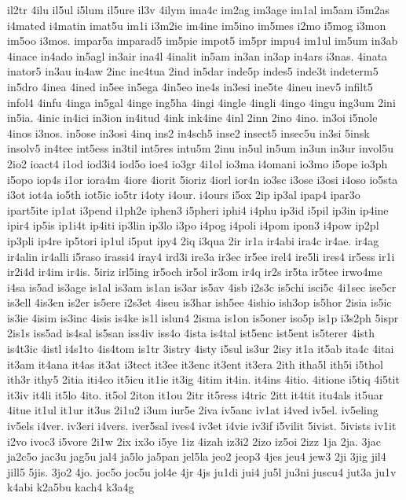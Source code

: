 {il2tr
4ilu
il5ul
i5lum
il5ure
il3v
4ilym
ima4c
im2ag
im3age
im1al
im5am
i5m2as
i4mated
i4matin
imat5u
im1i
i3m2ie
im4ine
im5ino
im5mes
i2mo
i5mog
i3mon
im5oo
i3mos.
impar5a
imparad5
im5pie
impot5
im5pr
impu4
im1ul
im5um
in3ab
4inace
in4ado
in5agl
in3air
ina4l
4inalit
in5am
in3an
in3ap
in4ars
i3nas.
4inata
inator5
in3au
in4aw
2inc
inc4tua
2ind
in5dar
inde5p
indes5
inde3t
indeterm5
in5dro
4inea
4ined
in5ee
in5ega
4in5eo
ine4s
in3esi
ine5te
4ineu
inev5
infilt5
infol4
4infu
4inga
in5gal
4inge
ing5ha
4ingi
4ingle
4ingli
4ingo
4ingu
ing3um
2ini
in5ia.
4inic
in4ici
in3ion
in4itud
4ink
ink4ine
4inl
2inn
2ino
4ino.
in3oi
i5nole
4inos
i3nos.
in5ose
in3osi
4inq
ins2
in4sch5
inse2
insect5
insec5u
in3si
5insk
insolv5
in4tee
int5ess
in3til
int5res
intu5m
2inu
in5ul
in5um
in3un
in3ur
invol5u
2io2
ioact4
i1od
iod3i4
iod5o
ioe4
io3gr
4i1ol
io3ma
i4omani
io3mo
i5ope
io3ph
i5opo
iop4s
i1or
iora4m
4iore
4iorit
5ioriz
4iorl
ior4n
io3sc
i3ose
i3osi
i4oso
io5sta
i3ot
iot4a
io5th
iot5ic
io5tr
i4oty
i4our.
i4ours
i5ox
2ip
ip3al
ipap4
ipar3o
ipart5ite
ip1at
i3pend
i1ph2e
iphen3
i5pheri
iphi4
i4phu
ip3id
i5pil
ip3in
ip4ine
ipir4
ip5is
ip1i4t
ip4iti
ip3lin
ip3lo
i3po
i4pog
i4poli
i4pom
ipon3
i4pow
ip2pl
ip3pli
ip4re
ip5tori
ip1ul
i5put
ipy4
2iq
i3qua
2ir
ir1a
ir4abi
ira4c
ir4ae.
ir4ag
ir4alin
ir4alli
i5raso
irassi4
iray4
ird3i
ire3a
ir3ec
ir5ee
irel4
ire5li
ires4
ir5ess
ir1i
ir2i4d
ir4im
ir4is.
5iriz
irl5ing
ir5och
ir5ol
ir3om
ir4q
ir2s
ir5ta
ir5tee
irwo4me
i4sa
is5ad
is3age
is1al
is3am
is1an
is3ar
is5av
4isb
i2s3c
is5chi
isci5c
4i1sec
ise5cr
is3ell
4is3en
is2er
is5ere
i2s3et
4iseu
is3har
ish5ee
4ishio
ish3op
is5hor
2isia
is5ic
is3ie
4isim
is3inc
4isis
is4ke
is1l
islun4
2isma
is1on
is5oner
iso5p
is1p
i3s2ph
5ispr
2is1s
iss5ad
is4sal
is5san
iss4iv
iss4o
4ista
is4tal
ist5enc
ist5ent
is5terer
4isth
is4t3ic
4istl
i4s1to
4is4tom
is1tr
3istry
4isty
i5sul
is3ur
2isy
it1a
it5ab
ita4c
4itai
it3am
it4ana
it4as
it3at
i3tect
it3ee
it3enc
it3ent
it3era
2ith
itha5l
ith5i
i5thol
ith3r
ithy5
2itia
iti4co
it5icu
it1ie
it3ig
4itim
it4in.
it4ins
4itio.
4itione
i5tiq
4i5tit
it3iv
it4li
it5lo
4ito.
it5ol
2iton
it1ou
2itr
it5ress
i4tric
2itt
it4tit
itu4als
it5uar
4itue
it1ul
it1ur
it3us
2i1u2
i3um
iur5e
2iva
iv5anc
iv1at
i4ved
iv5el.
iv5eling
iv5els
i4ver.
iv3eri
i4vers.
iver5sal
ives4
iv3et
i4vie
iv3if
i5vilit
5ivist.
5ivists
iv1it
i2vo
ivoc3
i5vore
2i1w
2ix
ix3o
i5ye
1iz
4izah
iz3i2
2izo
iz5oi
2izz
1ja
2ja.
3jac
ja2c5o
jac3u
jag5u
jal4
ja5lo
ja5pan
jel5la
jeo2
jeop3
4jes
jeu4
jew3
2ji
3jig
jil4
jill5
5jis.
3jo2
4jo.
joc5o
joc5u
jol4e
4jr
4js
ju1di
jui4
ju5l
ju3ni
juscu4
jut3a
ju1v
k4abi
k2a5bu
kach4
k3a4g
}
